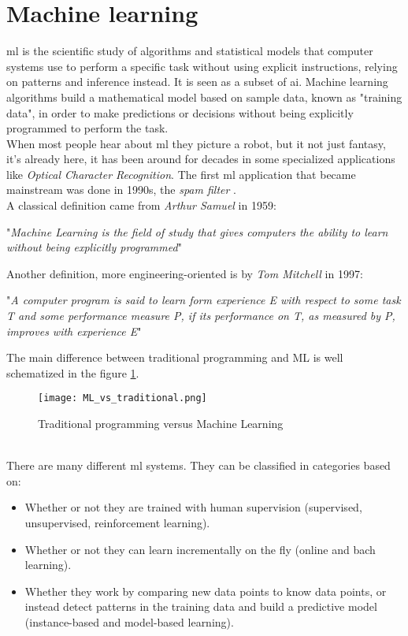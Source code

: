 \section{Machine learning}\label{ML}
\gls{ml} is the scientific study of algorithms and statistical models that computer systems use to perform a specific task without using explicit instructions, relying on patterns and inference instead. It is seen as a subset of \gls{ai}. Machine learning algorithms build a mathematical model based on sample data, known as "training data", in order to make predictions or decisions without being explicitly programmed to perform the task.
\\ \indent
When most people hear about \gls{ml} they picture a robot, but it not just fantasy, it's already here, it has been around for decades in some specialized applications like \textit{Optical Character Recognition}. The first \gls{ml} application that became mainstream was done in 1990s, the \textit{spam filter} \cite{geron2019hands}.
\\
A classical definition came from \textit{Arthur Samuel} in 1959:
\begin{center}
"\textit{Machine Learning is the field of study that gives computers the ability to learn without being explicitly programmed}" 
\end{center}
Another definition, more engineering-oriented is by \textit{Tom Mitchell} in 1997:
\begin{center}
"\textit{A computer program is said to learn form experience E with respect to some task T and some performance measure P, if its performance on T, as measured by P, improves with experience E}"
\end{center}
The main difference between traditional programming and ML is well schematized in the figure \ref{fig:ML_vs_traditional}.
\begin{figure}[h]
    \centering
    \texttt{[image: ML\_vs\_traditional.png]} 
	\caption{Traditional programming versus Machine Learning}
    \label{fig:ML_vs_traditional}
\end{figure}
\\
There are many different \gls{ml} systems. They can be classified in categories based on:
\begin{itemize}
	\item Whether or not they are trained with human supervision (supervised, unsupervised, reinforcement learning).
	\item Whether or not they can learn incrementally on the fly (online and bach learning).
	\item Whether they work by comparing new data points to know data points, or instead detect patterns in the training data and build a predictive model (instance-based and model-based learning).
\end{itemize}
